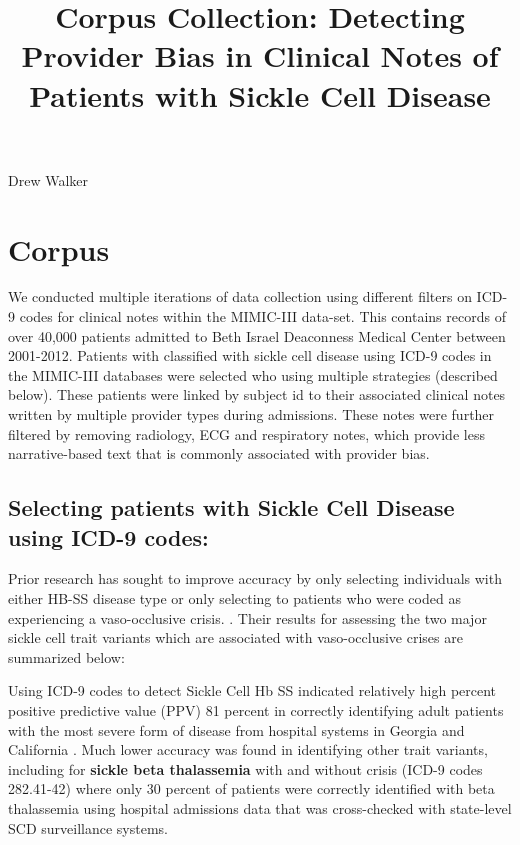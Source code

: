 \documentclass[12pt]{article} %
\title{Corpus Collection: Detecting Provider Bias in Clinical Notes of Patients with Sickle Cell Disease}
\author{}\date{} %
\newcommand{\authors}{Drew Walker}
\begin{document}
\hfill\authors %
\vspace{-0.25in} %
{\let\newpage\relax\maketitle} %
\vspace{-1in} %

\section*{Corpus}
We conducted multiple iterations of data collection using different filters on ICD-9 codes for clinical notes within the MIMIC-III data-set. This contains records of over 40,000 patients admitted to Beth Israel Deaconness Medical Center between 2001-2012. Patients with classified with sickle cell disease using ICD-9 codes in the MIMIC-III databases were selected who using multiple strategies (described below). These patients were linked by subject id to their associated clinical notes written by multiple provider types during admissions. These notes were further filtered by removing radiology, ECG and respiratory notes, which provide less narrative-based text that is commonly associated with provider bias.
\subsection{Selecting patients with Sickle Cell Disease using ICD-9 codes:}
Prior research has sought to improve accuracy by only selecting individuals with either HB-SS disease type or only selecting to patients who were coded as experiencing a vaso-occlusive crisis. \cite{snyder_accuracy_2017}. Their results for assessing the two major sickle cell trait variants which are associated with vaso-occlusive crises are summarized below: 

Using ICD-9 codes to detect Sickle Cell Hb SS indicated relatively high percent positive predictive value (PPV) 81 percent in correctly identifying adult patients with the most severe form of disease  from hospital systems in Georgia and California  \cite{snyder_accuracy_2017}. Much lower accuracy was found in identifying other trait variants, including  for\textbf{ sickle beta thalassemia} with and without crisis (ICD-9 codes 282.41-42) where only 30 percent of patients were correctly identified with beta thalassemia using hospital admissions data that was cross-checked with state-level SCD surveillance systems.
\end{document}
